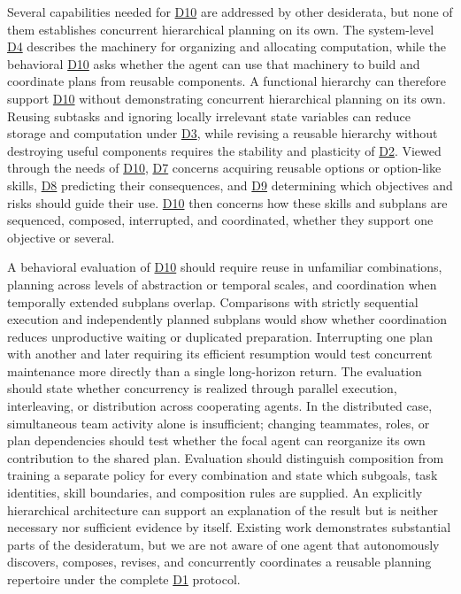 \documentclass[10pt,journal,compsoc]{IEEEtran}
\DeclareRobustCommand{\Dref}[1]{\hyperref[sec:d#1]{D#1}}
\begin{document}
Several capabilities needed for \Dref{10} are addressed by other desiderata, but none of them establishes concurrent hierarchical planning on its own.
The system-level \Dref{4} describes the machinery for organizing and allocating computation, while the behavioral \Dref{10} asks whether the agent can use that machinery to build and coordinate plans from reusable components.
A functional hierarchy can therefore support \Dref{10} without demonstrating concurrent hierarchical planning on its own.
Reusing subtasks and ignoring locally irrelevant state variables can reduce storage and computation under \Dref{3}, while revising a reusable hierarchy without destroying useful components requires the stability and plasticity of \Dref{2}.
Viewed through the needs of \Dref{10}, \Dref{7} concerns acquiring reusable options or option-like skills, \Dref{8} predicting their consequences, and \Dref{9} determining which objectives and risks should guide their use.
\Dref{10} then concerns how these skills and subplans are sequenced, composed, interrupted, and coordinated, whether they support one objective or several.

A behavioral evaluation of \Dref{10} should require reuse in unfamiliar combinations, planning across levels of abstraction or temporal scales, and coordination when temporally extended subplans overlap.
Comparisons with strictly sequential execution and independently planned subplans would show whether coordination reduces unproductive waiting or duplicated preparation.
Interrupting one plan with another and later requiring its efficient resumption would test concurrent maintenance more directly than a single long-horizon return.
The evaluation should state whether concurrency is realized through parallel execution, interleaving, or distribution across cooperating agents.
In the distributed case, simultaneous team activity alone is insufficient; changing teammates, roles, or plan dependencies should test whether the focal agent can reorganize its own contribution to the shared plan.
Evaluation should distinguish composition from training a separate policy for every combination and state which subgoals, task identities, skill boundaries, and composition rules are supplied.
An explicitly hierarchical architecture can support an explanation of the result but is neither necessary nor sufficient evidence by itself.
Existing work demonstrates substantial parts of the desideratum, but we are not aware of one agent that autonomously discovers, composes, revises, and concurrently coordinates a reusable planning repertoire under the complete \Dref{1} protocol.
\end{document}
